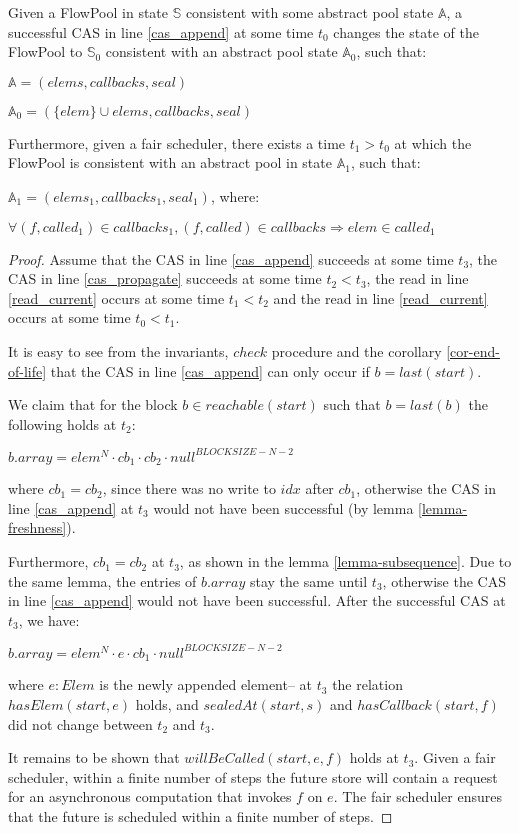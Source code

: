 \documentclass[runningheads,a4paper]{llncs}
\begin{document}
\begin{lemma}\label{lemma-append}
Given a FlowPool in state $\mathbb{S}$ consistent with some abstract pool state $\mathbb{A}$, 
a successful CAS in line \ref{cas_append} at some time $t_0$ changes the state of the FlowPool 
to $\mathbb{S}_0$ consistent with an abstract pool state $\mathbb{A}_0$, such that:

$\mathbb{A} = (elems, callbacks, seal)$

$\mathbb{A}_0 = (\{elem\} \cup elems, callbacks, seal)$

Furthermore, given a fair scheduler, there exists a time $t_1 > t_0$ at which the FlowPool 
is consistent with an abstract pool in state $\mathbb{A}_1$, such that:

$\mathbb{A}_1 = (elems_1, callbacks_1, seal_1)$, where:

$\forall (f, called_1) \in callbacks_1, (f, called) \in callbacks \Rightarrow elem \in called_1$
\end{lemma}

\begin{proof}
Assume that the CAS in line \ref{cas_append} succeeds at some time
$t_3$, the CAS in line \ref{cas_propagate} succeeds at some time $t_2 <
t_3$, the read in line \ref{read_current} occurs at some time $t_1 <
t_2$ and the read in line \ref{read_current} occurs at some time $t_0
< t_1$.

It is easy to see from the invariants, $check$ procedure and the
corollary \ref{cor-end-of-life} that the CAS in line \ref{cas_append} can only
occur if $b = last(start)$.

We claim that for the block $b \in reachable(start)$ such that $b = last(b)$ the
following holds at $t_2$:

$b.array = elem^N \cdot cb_1 \cdot cb_2 \cdot null^{BLOCKSIZE - N - 2}$

where $cb_1 = cb_2$, since there was no write to $idx$ after $cb_1$, otherwise the
CAS in line \ref{cas_append} at $t_3$ would not have been successful
(by lemma \ref{lemma-freshness}).

Furthermore, $cb_1 = cb_2$ at $t_3$, as shown in the lemma
\ref{lemma-subsequence}. Due to the same lemma, the entries of
$b.array$ stay the same until $t_3$, otherwise the CAS in line
\ref{cas_append} would not have been successful.
After the successful CAS at $t_3$, we have:

$b.array = elem^N \cdot e \cdot cb_1 \cdot null^{BLOCKSIZE - N - 2}$

where $e: Elem$ is the newly appended element-- at $t_3$ the relation
$hasElem(start, e)$ holds, and $sealedAt(start, s)$ and $hasCallback(start,
f)$ did not change between $t_2$ and $t_3$.

It remains to be shown that $willBeCalled(start, e, f)$ holds at $t_3$.
Given a fair scheduler, within a finite number of steps the
future store will contain a request for an asynchronous computation
that invokes $f$ on $e$. The fair scheduler ensures that the future is
scheduled within a finite number of steps.
\end{proof}
\end{document}

